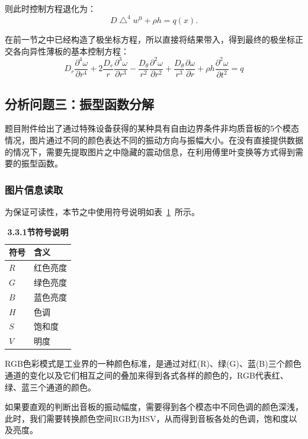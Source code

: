 \documentclass[withoutpreface,bwprint]{cumcmthesis} %
\begin{document}
则此时控制方程退化为：
\begin{equation}
    D\bigtriangleup^4w^0+\rho h=q(x). 
\end{equation}

在前一节之中已经构造了极坐标方程，所以直接将结果带入，得到最终的极坐标正交各向异性薄板的基本控制方程：
\begin{equation}
    D_r\frac{\partial^4 \omega}{\partial r^4}+2\frac{D_r}{r}\frac{\partial^3 \omega}{\partial r^3}-\frac{D_\theta}{r^2}\frac{\partial^2 \omega}{\partial r^2}+\frac{D_\theta}{r^3}\frac{\partial \omega}{\partial r}+\rho h \frac{\partial^2 \omega}{\partial t^2}=q
\end{equation}
\subsection{分析问题三：振型函数分解}
题目附件给出了通过特殊设备获得的某种具有自由边界条件非均质音板的5个模态情况，图片通过不同的颜色表达不同的振动方向与振幅大小。在没有直接提供数据的情况下，需要先提取图片之中隐藏的震动信息，在利用傅里叶变换等方式得到需要的振型函数。
\subsubsection{图片信息读取}
为保证可读性，本节之中使用符号说明如表~\ref{table-5}~所示。

\begin{table}[H]
	\caption{\textbf{3.3.1节符号说明}}%
	\centering
	\begin{tabular}{ll}%
		\hline %
		符号   &  含义  \\
		\hline %
		$R$&红色亮度\\
		$G$&绿色亮度\\
		$B$&蓝色亮度\\
	    $H$&色调\\
	    $S$&饱和度\\
	    $V$&明度\\
		\hline %
	\end{tabular}\label{table-5}
\end{table}
RGB色彩模式是工业界的一种颜色标准，是通过对红(R)、绿(G)、蓝(B)三个颜色通道的变化以及它们相互之间的叠加来得到各式各样的颜色的，RGB代表红、绿、蓝三个通道的颜色。

如果要直观的判断出音板的振动幅度，需要得到各个模态中不同色调的颜色深浅，此时，我们需要转换颜色空间RGB为HSV，从而得到音板各处的色调，饱和度以及亮度。
\end{document}
